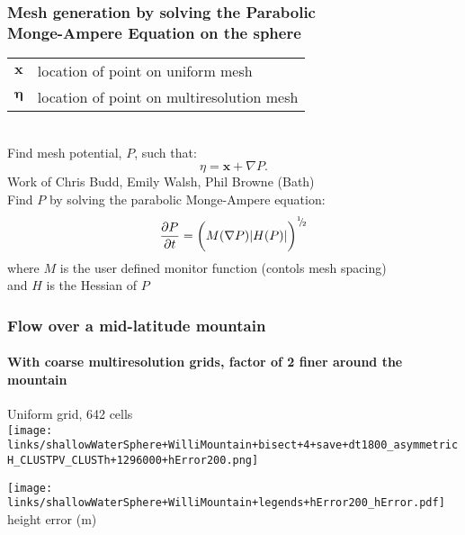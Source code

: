 \begin{frame}
\frametitle{Mesh generation by solving the Parabolic\\
Monge-Ampere Equation on the sphere}

\begin{tabular}{ll}
$\mathbf{x}$ & location of point on uniform mesh\\
$\mathbf{\eta}$ & location of point on multiresolution mesh\\
\end{tabular}\\
Find mesh potential, $P$, such that:
\begin{equation*}
\eta = \mathbf{x} + \nabla P.
\end{equation*}
Work of Chris Budd, Emily Walsh, Phil Browne (Bath)\\
Find $P$ by solving the parabolic Monge-Ampere equation:\\
\begin{equation*}
\frac{\partial P}{\partial t} = \biggl(M(\nabla P) |H(P)|\biggr)^{^1\negthickspace/\negthinspace_2}
\end{equation*}
where $M$ is the user defined monitor function (contols mesh spacing)\\
and $H$ is the Hessian of $P$

\end{frame}

\begin{frame}
\frametitle{Flow over a mid-latitude mountain}
\framesubtitle{With coarse multiresolution grids, factor of 2 finer around the mountain}

\begin{minipage}{0.48\linewidth}
Uniform grid, 642 cells \\
\texttt{[image: links/shallowWaterSphere+WilliMountain+bisect+4+save+dt1800\_asymmetricH\_CLUSTPV\_CLUSTh+1296000+hError200.png]}
\end{minipage}

\texttt{[image: links/shallowWaterSphere+WilliMountain+legends+hError200\_hError.pdf]}  \hfill height error (m)
\end{frame}
 
